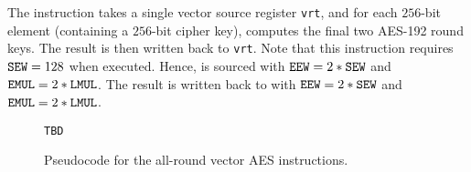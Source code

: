 The  instruction takes a single
vector source register {\tt vrt}, and for each $256$-bit element
(containing a $256$-bit cipher key),
computes the final two AES-192 round keys.
The result is then written back to {\tt vrt}.
Note that this instruction requires ${\tt SEW}=128$ when executed.
Hence, \vrt is sourced with ${\tt EEW}=2*{\tt SEW}$ and ${\tt EMUL}=2*{\tt LMUL}$.
The result is written back to \vrt with
${\tt EEW}=2*{\tt SEW}$ and ${\tt EMUL}=2*{\tt LMUL}$.


\begin{figure}[h]
\begin{lstlisting}[language=pseudo]
TBD
\end{lstlisting}
\caption{Pseudocode for the all-round vector AES instructions.}
\label{fig:pseudo:aes:vector:all-round}
\end{figure}

